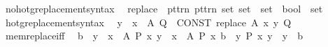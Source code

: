 \begin{isabellebody}
\isamarkupfalse%
\isanewline
{}\isamarkupfalse%
\ no{\isacharunderscore}{\kern0pt}hotg{\isacharunderscore}{\kern0pt}replacement{\isacharunderscore}{\kern0pt}syntax\isanewline
{}\isanewline
{}\isamarkupfalse%
\isanewline
\ \ {\isachardoublequoteopen}{\isacharunderscore}{\kern0pt}replace{\isachardoublequoteclose}\ {\isacharcolon}{\kern0pt}{\isacharcolon}{\kern0pt}\ {\isacartoucheopen}{\isacharbrackleft}{\kern0pt}pttrn{\isacharcomma}{\kern0pt}\ pttrn{\isacharcomma}{\kern0pt}\ set{\isacharcomma}{\kern0pt}\ set\ {\isasymRightarrow}\ set\ {\isasymRightarrow}\ bool{\isacharbrackright}{\kern0pt}\ {\isacharequal}{\kern0pt}{\isachargreater}{\kern0pt}\ set{\isacartoucheclose}\ {\isacharparenleft}{\kern0pt}{\isachardoublequoteopen}{\isacharbraceleft}{\kern0pt}{\isacharunderscore}{\kern0pt}\ {\isacharbar}{\kern0pt}{\isacharslash}{\kern0pt}\ {\isacharunderscore}{\kern0pt}\ {\isasymin}\ {\isacharunderscore}{\kern0pt}{\isacharcomma}{\kern0pt}\ {\isacharunderscore}{\kern0pt}{\isacharbraceright}{\kern0pt}{\isachardoublequoteclose}{\isacharparenright}{\kern0pt}\isanewline
{}\isamarkupfalse%
\isanewline
{}\isamarkupfalse%
\ hotg{\isacharunderscore}{\kern0pt}replacement{\isacharunderscore}{\kern0pt}syntax\isanewline
{}\isamarkupfalse%
\isanewline
\ \ {\isachardoublequoteopen}{\isacharbraceleft}{\kern0pt}y\ {\isacharbar}{\kern0pt}\ x\ {\isasymin}\ A{\isacharcomma}{\kern0pt}\ Q{\isacharbraceright}{\kern0pt}{\isachardoublequoteclose}\ {\isasymrightleftharpoons}\ {\isachardoublequoteopen}CONST\ replace\ A\ {\isacharparenleft}{\kern0pt}{\isasymlambda}x\ y{\isachardot}{\kern0pt}\ Q{\isacharparenright}{\kern0pt}{\isachardoublequoteclose}\isanewline
\isanewline
{}\isamarkupfalse%
\ mem{\isacharunderscore}{\kern0pt}replace{\isacharunderscore}{\kern0pt}iff{\isacharcolon}{\kern0pt}\isanewline
\ \ {\isachardoublequoteopen}b\ {\isasymin}\ {\isacharbraceleft}{\kern0pt}y\ {\isacharbar}{\kern0pt}\ x\ {\isasymin}\ A{\isacharcomma}{\kern0pt}\ P\ x\ y{\isacharbraceright}{\kern0pt}\ {\isasymlongleftrightarrow}\ {\isacharparenleft}{\kern0pt}{\isasymexists}x\ {\isasymin}\ A{\isachardot}{\kern0pt}\ P\ x\ b\ {\isasymand}\ {\isacharparenleft}{\kern0pt}{\isasymforall}y{\isachardot}{\kern0pt}\ P\ x\ y\ {\isasymlongrightarrow}\ y\ {\isacharequal}{\kern0pt}\ b{\isacharparenright}{\kern0pt}{\isacharparenright}{\kern0pt}{\isachardoublequoteclose}\isanewline
%
\isadelimproof
%
\endisadelimproof
%
\isatagproof
{}\isamarkupfalse%

\end{isabellebody}
